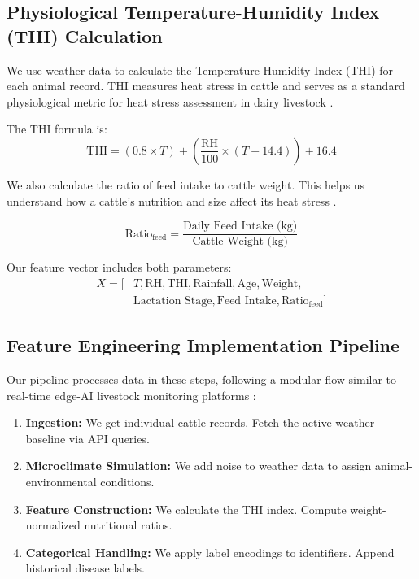 \documentclass[conference]{IEEEtran}
\begin{document}
	\subsection{Physiological Temperature-Humidity Index (THI) Calculation}
	We use weather data to calculate the Temperature-Humidity Index (THI) for each animal record. THI measures heat stress in cattle and serves as a standard physiological metric for heat stress assessment in dairy livestock \cite{ref1}.
	
	The THI formula is:
	$$\text{THI} = (0.8 \times T) + \left(\frac{\text{RH}}{100} \times (T - 14.4)\right) + 16.4$$
	
	We also calculate the ratio of feed intake to cattle weight. This helps us understand how a cattle's nutrition and size affect its heat stress \cite{ref18, ref15}.
	
	$$\text{Ratio}_{\text{feed}} = \frac{\text{Daily Feed Intake (kg)}}{\text{Cattle Weight (kg)}}$$
	
	Our feature vector includes both parameters:
		\[
		\begin{aligned}
			X = [&T,\text{RH},\text{THI},\text{Rainfall},\text{Age},\text{Weight},\\
			&\text{Lactation Stage},\text{Feed Intake},\text{Ratio}_{\text{feed}}]
		\end{aligned}
		\]
		
		\subsection{Feature Engineering Implementation Pipeline}
		Our pipeline processes data in these steps, following a modular flow similar to real-time edge-AI livestock monitoring platforms \cite{ref13, ref14}:
		
		\begin{enumerate}
			\item \textbf{Ingestion:} We get individual cattle records. Fetch the active weather baseline via API queries.
			
			\item \textbf{Microclimate Simulation:} We add noise to weather data to assign animal-environmental conditions.
			
			\item \textbf{Feature Construction:} We calculate the THI index. Compute weight-normalized nutritional ratios.
			
			\item \textbf{Categorical Handling:} We apply label encodings to identifiers. Append historical disease labels.
		\end{enumerate}
		
\end{document}
